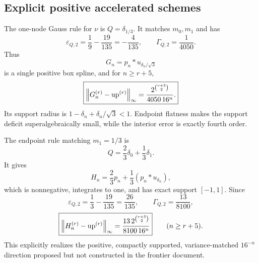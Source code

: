 \documentclass[11pt,oneside]{article}
\numberwithin{equation}{section}
\theoremstyle{definition}
\theoremstyle{remark}
\newcommand{\Up}{\operatorname{up}}
\begin{document}
\subsection{Explicit positive accelerated schemes}

\begin{example}
\label{p3:ex:gauss-one}
The one-node Gauss rule for $\nu$ is $Q=\delta_{1/3}$.  It matches $m_0,m_1$ and
has
\[
 \varepsilon_{Q,2}=\frac19-\frac{19}{135}=-\frac4{135},
 \qquad \Gamma_{Q,2}=\frac1{4050}.
\]
Thus
\begin{equation}
 G_n=p_n*u_{\delta_n/\sqrt3}
 \label{p3:eq:Gn}
\end{equation}
is a single positive box spline, and for $n\ge r+5$,
\begin{equation}
 \boxed{
 \norm{G_n^{(r)}-\Up^{(r)}}_\infty
 =\frac{2^{\binom{r+5}{2}}}{4050\,16^n}.}
 \label{p3:eq:Gauss-one-law}
\end{equation}
Its support radius is $1-\delta_n+\delta_n/\sqrt3<1$.  Endpoint flatness makes the
support deficit superalgebraically small, while the interior error is exactly fourth
order.
\end{example}

\begin{example}
\label{p3:ex:lobatto-two}
The endpoint rule matching $m_1=1/3$ is
\begin{equation}
 Q=\frac23\delta_0+\frac13\delta_1.
 \label{p3:eq:lobatto-Q}
\end{equation}
It gives
\begin{equation}
 H_n=\frac23p_n+\frac13(p_n*u_{\delta_n}),
 \label{p3:eq:Hn}
\end{equation}
which is nonnegative, integrates to one, and has exact support $[-1,1]$.  Since
\[
 \varepsilon_{Q,2}=\frac13-\frac{19}{135}=\frac{26}{135},
 \qquad \Gamma_{Q,2}=\frac{13}{8100},
\]
\begin{equation}
 \boxed{
 \norm{H_n^{(r)}-\Up^{(r)}}_\infty
 =\frac{13\,2^{\binom{r+5}{2}}}{8100\,16^n}}
 \qquad(n\ge r+5).
 \label{p3:eq:Lobatto-two-law}
\end{equation}
This explicitly realizes the positive, compactly supported, variance-matched
$16^{-n}$ direction proposed but not constructed in the frontier document.
\end{example}
\end{document}
